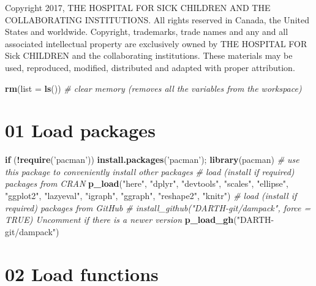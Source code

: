 \documentclass[
]{article}
\newenvironment{Shaded}{\begin{snugshade}}{\end{snugshade}}
\newcommand{\CommentTok}[1]{\textcolor[rgb]{0.56,0.35,0.01}{\textit{#1}}}
\newcommand{\ControlFlowTok}[1]{\textcolor[rgb]{0.13,0.29,0.53}{\textbf{#1}}}
\newcommand{\DataTypeTok}[1]{\textcolor[rgb]{0.13,0.29,0.53}{#1}}
\newcommand{\KeywordTok}[1]{\textcolor[rgb]{0.13,0.29,0.53}{\textbf{#1}}}
\newcommand{\NormalTok}[1]{#1}
\newcommand{\OperatorTok}[1]{\textcolor[rgb]{0.81,0.36,0.00}{\textbf{#1}}}
\newcommand{\StringTok}[1]{\textcolor[rgb]{0.31,0.60,0.02}{#1}}
\begin{document}
Copyright 2017, THE HOSPITAL FOR SICK CHILDREN AND THE COLLABORATING
INSTITUTIONS. All rights reserved in Canada, the United States and
worldwide. Copyright, trademarks, trade names and any and all associated
intellectual property are exclusively owned by THE HOSPITAL FOR Sick
CHILDREN and the collaborating institutions. These materials may be
used, reproduced, modified, distributed and adapted with proper
attribution.

\newpage

\begin{Shaded}
\begin{Highlighting}[]
\KeywordTok{rm}\NormalTok{(}\DataTypeTok{list =} \KeywordTok{ls}\NormalTok{())      }\CommentTok{# clear memory (removes all the variables from the workspace)}
\end{Highlighting}
\end{Shaded}

\hypertarget{load-packages}{%
\section{01 Load packages}\label{load-packages}}

\begin{Shaded}
\begin{Highlighting}[]
\ControlFlowTok{if}\NormalTok{ (}\OperatorTok{!}\KeywordTok{require}\NormalTok{(}\StringTok{'pacman'}\NormalTok{)) }\KeywordTok{install.packages}\NormalTok{(}\StringTok{'pacman'}\NormalTok{); }\KeywordTok{library}\NormalTok{(pacman) }\CommentTok{# use this package to conveniently install other packages}
 \CommentTok{# load (install if required) packages from CRAN}
 \KeywordTok{p_load}\NormalTok{(}\StringTok{"here"}\NormalTok{, }\StringTok{"dplyr"}\NormalTok{, }\StringTok{"devtools"}\NormalTok{, }\StringTok{"scales"}\NormalTok{, }\StringTok{"ellipse"}\NormalTok{, }\StringTok{"ggplot2"}\NormalTok{, }\StringTok{"lazyeval"}\NormalTok{, }\StringTok{"igraph"}\NormalTok{, }\StringTok{"ggraph"}\NormalTok{, }\StringTok{"reshape2"}\NormalTok{, }\StringTok{"knitr"}\NormalTok{)                                               }
 \CommentTok{# load (install if required) packages from GitHub}
 \CommentTok{# install_github("DARTH-git/dampack", force = TRUE) Uncomment if there is a newer version}
 \KeywordTok{p_load_gh}\NormalTok{(}\StringTok{"DARTH-git/dampack"}\NormalTok{) }
\end{Highlighting}
\end{Shaded}

\hypertarget{load-functions}{%
\section{02 Load functions}\label{load-functions}}
\end{document}
